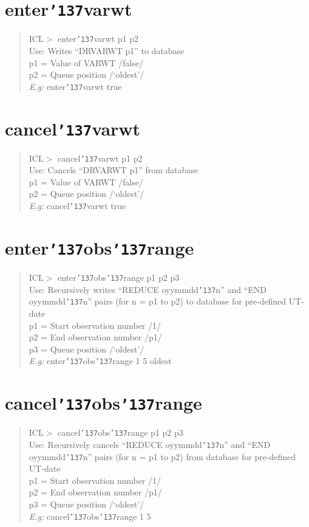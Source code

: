 \documentclass[a4paper]{book}
\renewcommand{\_}{{\tt\char'137}}
\begin{document}
\section{enter\_varwt}
\begin{quote}
ICL$>$ enter\_varwt p1 p2 \\
Use: Writes ``DRVARWT p1'' to database \\
p1 = Value of VARWT /false/ \\
p2 = Queue position /`oldest'/ \\
{\em E.g:} enter\_varwt true
\end{quote}
\section{cancel\_varwt}
\begin{quote}
ICL$>$ cancel\_varwt p1 p2 \\
Use: Cancels ``DRVARWT p1'' from database \\
p1 = Value of VARWT /false/ \\
p2 = Queue position /`oldest'/ \\
{\em E.g:} cancel\_varwt true
\end{quote}
\section{enter\_obs\_range}
\begin{quote}
ICL$>$ enter\_obs\_range p1 p2 p3 \\
Use: Recursively writes ``REDUCE oyymmdd\_n'' and
``END oyymmdd\_n'' pairs 
(for n = p1 to p2) to database for pre-defined UT-date \\
p1 = Start observation number /1/ \\
p2 = End observation number /p1/ \\
p3 = Queue position /`oldest'/ \\
{\em E.g:} enter\_obs\_range 1 5 oldest 
\end{quote}
\section{cancel\_obs\_range}
\begin{quote}
ICL$>$ cancel\_obs\_range p1 p2 p3 \\
Use: Recursively cancels ``REDUCE oyymmdd\_n'' and
``END oyymmdd\_n'' pairs 
(for n = p1 to p2) from database for pre-defined UT-date \\
p1 = Start observation number /1/ \\
p2 = End observation number /p1/ \\
p3 = Queue position /`oldest'/ \\
{\em E.g:} cancel\_obs\_range 1 5
\end{quote}
\end{document}
